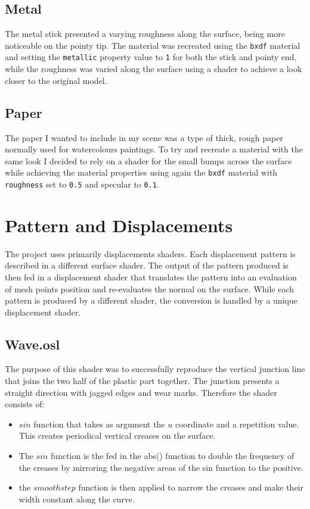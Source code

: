 \documentclass[tog]{acmsiggraph}
\begin{document}
\subsection{Metal}
The metal stick presented a varying roughness along the surface, being more noticeable on the pointy tip. The material was recreated using the \texttt{bxdf} material and setting the \texttt{metallic} property value to \texttt{1} for both the stick and pointy end, while the roughness was varied along the surface using a shader to achieve a look closer to the original model.

\subsection{Paper\label{paper}}
The paper I wanted to include in my scene was a type of thick, rough paper normally used for watercolours paintings. To try and recreate a material with the same look I decided to rely on a shader for the small bumps across the surface while achieving the material properties using again the \texttt{bxdf} material with \texttt{roughness} set to \texttt{0.5} and specular to \texttt{0.1}.

\section{Pattern and Displacements}

The project uses primarily displacements shaders. Each displacement pattern is described in a different surface shader. The output of the pattern produced is then fed in a displacement shader that translates the pattern into an evaluation of mesh points position and re-evaluates the normal on the surface. While each pattern is produced by a different shader, the conversion is handled by a unique displacement shader.

\subsection{Wave.osl}

The purpose of this shader was to successfully reproduce the vertical junction line that joins the two half of the plastic part together.
The junction presents a straight direction with jagged edges and wear marks. Therefore the shader consists of:

\begin{itemize}
  \item $sin$ function that takes as argument the $u$ coordinate and a repetition value. This creates periodical vertical creases on the surface.
  \item The $sin$ function is the fed in the abs() function to double the frequency of the creases by mirroring the negative areas of the sin function to the positive.
  \item the $smoothstep$ function is then applied to narrow the creases and make their width constant along the curve.
\end{itemize}
\end{document}

